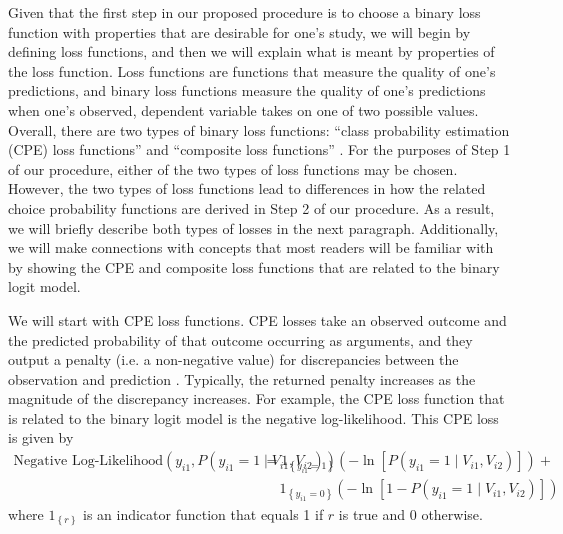 Given that the first step in our proposed procedure is to choose a binary loss function with properties that are desirable for one's study, we will begin by defining loss functions, and then we will explain what is meant by properties of the loss function. Loss functions are functions that measure the quality of one's predictions, and binary loss functions measure the quality of one's predictions when one's observed, dependent variable takes on one of two possible values. Overall, there are two types of binary loss functions: ``class probability estimation (CPE) loss functions'' and ``composite loss functions'' \citep{reid_composite_2010}. For the purposes of Step 1 of our procedure, either of the two types of loss functions may be chosen. However, the two types of loss functions lead to differences in how the related choice probability functions are derived in Step 2 of our procedure. As a result, we will briefly describe both types of losses in the next paragraph. Additionally, we will make connections with concepts that most readers will be familiar with by showing the CPE and composite loss functions that are related to the binary logit model. 

We will start with CPE loss functions. CPE losses take an observed outcome and the predicted probability of that outcome occurring as arguments, and they output a penalty (i.e. a non-negative value) for discrepancies between the observation and prediction \citep{reid_composite_2010}. Typically, the returned penalty increases as the magnitude of the discrepancy increases. For example, the CPE loss function that is related to the binary logit model is the negative log-likelihood. This CPE loss is given by
\begin{equation}
\label{eq:neg_log_likelihood}
\begin{aligned}
\textrm{Negative Log-Likelihood}\left(y_{i1},  P \left( y_{i1} = 1 \mid V_{i1}, V_{i2} \right) \right) &= 1_{\left\lbrace y_{i1} = 1 \right\rbrace} \left( - \ln \left[ P \left( y_{i1} = 1 \mid V_{i1}, V_{i2} \right) \right] \right) +\\
&\quad \  1_{\left\lbrace y_{i1} = 0 \right\rbrace} \left( - \ln \left[ 1 - P \left( y_{i1} = 1 \mid V_{i1}, V_{i2} \right) \right] \right)
\end{aligned}
\end{equation}
where $1_{\left\lbrace r \right\rbrace}$ is an indicator function that equals 1 if $r$ is true and 0 otherwise.

